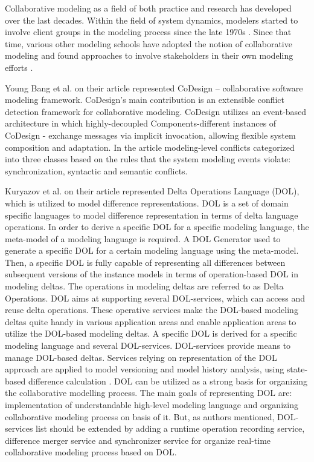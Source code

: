 
Collaborative modeling as a field of both practice and research has developed over the last decades. Within the field of system dynamics, modelers started to involve client groups in the modeling process since the late 1970s \cite{vennix1992model}. Since that time, various other modeling schools have adopted the notion of collaborative modeling and found approaches to involve stakeholders in their own modeling efforts \cite{renger2008challenges}.

Young Bang et al. on their article \cite{young2010codesign} represented CoDesign – collaborative software modeling framework. CoDesign's main contribution is an extensible conflict detection framework for collaborative modeling. CoDesign utilizes an event-based architecture in which highly-decoupled Components-different instances of CoDesign - exchange messages via implicit invocation, allowing flexible system composition and adaptation. In the article modeling-level conflicts categorized into three classes based on the rules that the system modeling events violate: synchronization, syntactic and semantic conflicts. 



Kuryazov et al. on their article \cite{kuryazov2015collaborative} represented Delta Operations Language (DOL), which is utilized to model difference representations. DOL is a set of domain specific languages to model difference representation in terms of delta language operations. In order to derive a specific DOL for a specific modeling language, the meta-model of a modeling language is required. A DOL Generator used to generate a specific DOL for a certain modeling language using the meta-model. Then, a specific DOL is fully capable of representing all differences between subsequent versions of the instance models in terms of operation-based DOL in modeling deltas. The operations in modeling deltas are referred to as Delta Operations. DOL aims at supporting several DOL-services, which can access and reuse delta operations. These operative services make the DOL-based modeling deltas quite handy in various application areas and enable application areas to utilize the DOL-based modeling deltas. A specific DOL is derived for a specific modeling language and several DOL-services. DOL-services provide means to manage DOL-based deltas. Services relying on representation of the DOL approach are applied to model versioning and model history analysis, using state-based difference calculation \cite{kuryazov2015collaborative}. DOL can be utilized as a strong basis for organizing the collaborative modelling process. The main goals of representing DOL are: implementation of understandable high-level modeling language and organizing collaborative modeling process on basis of it. But, as authors mentioned, DOL-services list should be extended by adding a runtime operation recording service, difference merger service and synchronizer service for organize real-time collaborative modeling process based on DOL.